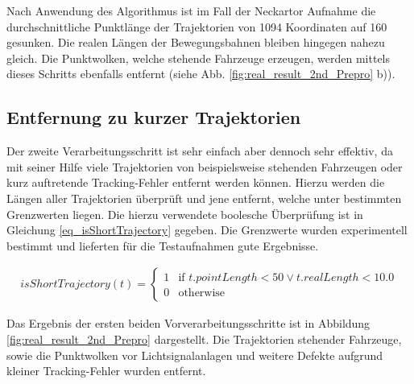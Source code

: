 Nach Anwendung des Algorithmus ist im Fall der Neckartor Aufnahme die durchschnittliche Punktlänge
der Trajektorien von 1094 Koordinaten auf 160 gesunken. Die realen Längen der Bewegungsbahnen bleiben
hingegen nahezu gleich. Die Punktwolken, welche stehende Fahrzeuge erzeugen, werden mittels dieses
Schritts ebenfalls entfernt (siehe Abb. \ref{fig:real_result_2nd_Prepro} b)).


\subsection{Entfernung zu kurzer Trajektorien}
Der zweite Verarbeitungsschritt ist sehr einfach aber dennoch sehr effektiv, da mit seiner Hilfe viele
Trajektorien von beispielsweise stehenden Fahrzeugen oder kurz auftretende Tracking-Fehler entfernt
werden können. Hierzu werden die Längen aller Trajektorien überprüft und jene entfernt, welche
unter bestimmten Grenzwerten liegen. Die hierzu verwendete boolesche Überprüfung ist in Gleichung
\ref{eq_isShortTrajectory} gegeben. Die Grenzwerte wurden experimentell bestimmt und lieferten für die
Testaufnahmen gute Ergebnisse.

\begin{ceqn}
\begin{align}
\label{eq_isShortTrajectory}
    isShortTrajectory(t) =
    \begin{cases}
        1 & \text{if } t.pointLength < 50 \lor t.realLength < 10.0 \\
        0 & \text{otherwise}
    \end{cases}
\end{align}
\end{ceqn}

Das Ergebnis der ersten beiden Vorverarbeitungsschritte ist in Abbildung \ref{fig:real_result_2nd_Prepro} dargestellt.
Die Trajektorien stehender Fahrzeuge, sowie die Punktwolken vor Lichtsignalanlagen und weitere Defekte aufgrund
kleiner Tracking-Fehler wurden entfernt.

